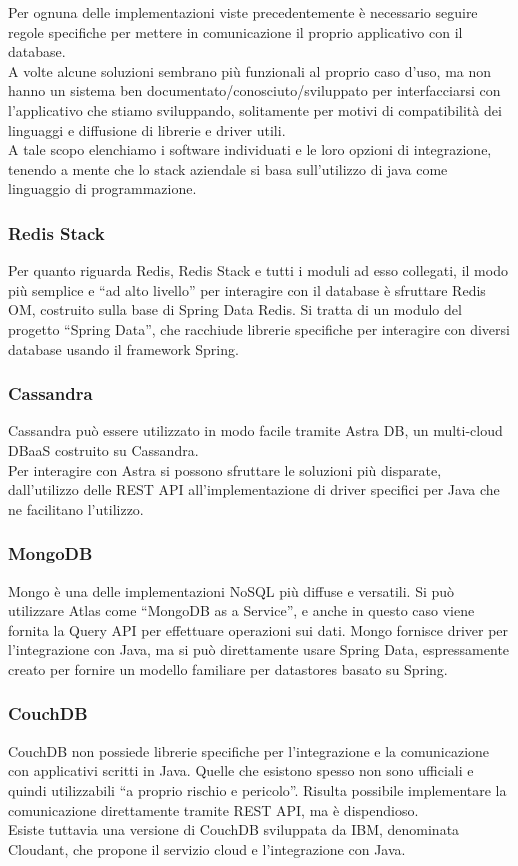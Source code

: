 \noindent Per ognuna delle implementazioni viste precedentemente è necessario seguire regole specifiche per mettere in comunicazione il proprio applicativo con il database.\\
A volte alcune soluzioni sembrano più funzionali al proprio caso d'uso, ma non hanno un sistema ben documentato/conosciuto/sviluppato per interfacciarsi con l'applicativo che stiamo sviluppando, solitamente per motivi di compatibilità dei linguaggi e diffusione di librerie e driver utili.\\
A tale scopo elenchiamo i software individuati e le loro opzioni di integrazione, tenendo a mente che lo stack aziendale si basa sull'utilizzo di java come linguaggio di programmazione.

\subsubsection{Redis Stack}
Per quanto riguarda Redis, Redis Stack e tutti i moduli ad esso collegati, il modo più semplice e ``ad alto livello'' per interagire con il database è sfruttare Redis OM, costruito sulla base di Spring Data Redis. Si tratta di un modulo del progetto ``Spring Data'', che racchiude librerie specifiche per interagire con diversi database usando il framework Spring.

\subsubsection{Cassandra}
Cassandra può essere utilizzato in modo facile tramite Astra DB, un multi-cloud DBaaS costruito su Cassandra.\\
Per interagire con Astra si possono sfruttare le soluzioni più disparate, dall'utilizzo delle REST API all'implementazione di driver specifici per Java che ne facilitano l'utilizzo.

\subsubsection{MongoDB}
Mongo è una delle implementazioni NoSQL più diffuse e versatili. Si può utilizzare Atlas come ``MongoDB as a Service'', e anche in questo caso viene fornita la Query API per effettuare operazioni sui dati. Mongo fornisce driver per l'integrazione con Java, ma si può direttamente usare Spring Data, espressamente creato per fornire un modello familiare per datastores basato su Spring.

\subsubsection{CouchDB}
CouchDB non possiede librerie specifiche per l'integrazione e la comunicazione con applicativi scritti in Java. Quelle che esistono spesso non sono ufficiali e quindi utilizzabili ``a proprio rischio e pericolo''. Risulta possibile implementare la comunicazione direttamente tramite REST API, ma è dispendioso.\\
Esiste tuttavia una versione di CouchDB sviluppata da IBM, denominata Cloudant, che propone il servizio cloud e l'integrazione con Java.

